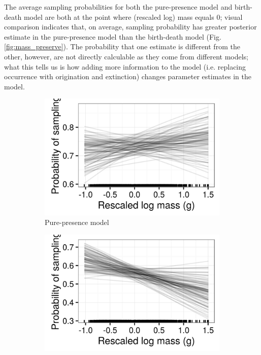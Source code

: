 \documentclass[12pt,letterpaper]{article}
\begin{document}
The average sampling probabilities for both the pure-presence model and birth-death model are both at the point where (rescaled log) mass equals 0; visual comparison indicates that, on average, sampling probability has greater posterior estimate in the pure-presence model than the birth-death model (Fig.\ref{fig:mass_preserve}). The probability that one estimate is different from the other, however, are not directly calculable as they come from different models; what this tells us is how adding more information to the model (i.e. replacing occurrence with origination and extinction) changes parameter estimates in the model.

\begin{figure}[ht]
  \begin{subfigure}[b]{0.45\textwidth}
    \includegraphics[width=\textwidth,height=0.5\textheight,keepaspectratio=true]{figure/mass_on_samp}
    \caption{Pure-presence model}
    \label{fig:mass_preserve_pure_pres}
  \end{subfigure}
  \begin{subfigure}[b]{0.45\textwidth}
    \includegraphics[width=\textwidth,height=0.5\textheight,keepaspectratio=true]{figure/mass_on_samp_bd}

\end{subfigure}
\end{figure}
\end{document}
